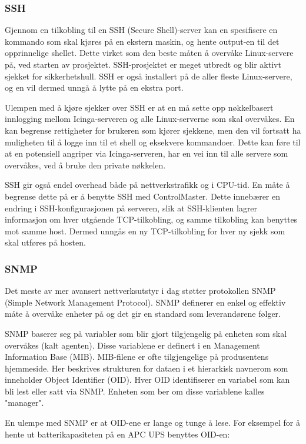 \subsubsection{SSH}
Gjennom en tilkobling til en SSH (Secure Shell)-server kan en spesifisere en kommando som skal kjøres på en ekstern maskin, og hente output-en til det opprinnelige shellet. Dette virket som den beste måten å overvåke Linux-servere på, ved starten av prosjektet. SSH-prosjektet er meget utbredt og blir aktivt sjekket for sikkerhetshull. SSH er også installert på de aller fleste Linux-servere, og en vil dermed unngå å lytte på en ekstra port.

Ulempen med å kjøre sjekker over SSH er at en må sette opp nøkkelbasert innlogging mellom Icinga-serveren og alle Linux-serverne som skal overvåkes. En kan begrense rettigheter for brukeren som kjører sjekkene, men den vil fortsatt ha muligheten til å logge inn til et shell og eksekvere kommandoer. Dette kan føre til at en potensiell angriper via Icinga-serveren, har en vei inn til alle servere som overvåkes, ved å bruke den private nøkkelen.

SSH gir også endel overhead både på nettverkstrafikk og i CPU-tid\cite{sshmanpage}. En måte å begrense dette på er å benytte SSH med ControlMaster. Dette innebærer en endring i SSH-konfigurasjonen på serveren, slik at SSH-klienten lagrer informasjon om hver utgående TCP-tilkobling, og samme tilkobling kan benyttes mot samme host. Dermed unngås en ny TCP-tilkobling for hver ny sjekk som skal utføres på hosten.

\subsubsection{SNMP}
Det meste av mer avansert nettverksutstyr i dag støtter protokollen SNMP (Simple Network Management Protocol)\cite{essentialsnmp}. SNMP definerer en enkel og effektiv måte å overvåke enheter på og det gir en standard som leverandørene følger.
	
SNMP baserer seg på variabler som blir gjort tilgjengelig på enheten som skal overvåkes (kalt agenten). Disse variablene er definert i en Management Information Base (MIB). MIB-filene er ofte tilgjengelige på produsentens hjemmeside. Her beskrives strukturen for dataen i et hierarkisk navnerom som inneholder Object Identifier (OID). Hver OID identifiserer en variabel som kan bli lest eller satt via SNMP. Enheten som ber om disse variablene kalles "manager". 

En ulempe med SNMP er at OID-ene er lange og tunge å lese. For eksempel for å hente ut batterikapasiteten på en APC UPS benyttes OID-en:

